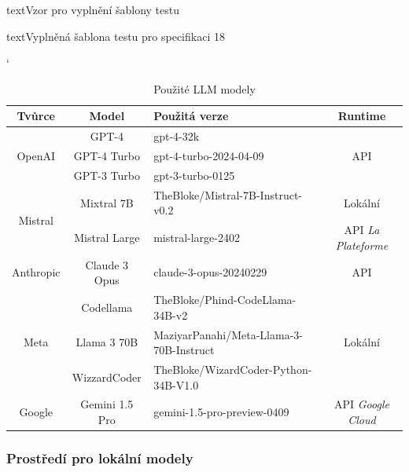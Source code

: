 \documentclass[czech, ma, kiv, he, iso690numb, pdf, viewonly]{fasthesis}
\begin{document}
\begin{code}{text}{Vzor pro vyplnění šablony testu \label{lst:template}}
{\begin{code}{text}{Vyplněná šablona testu pro specifikaci 18 \label{lst:spec18}}
{            \begin{table}[H]
                \catcode`
                \begin{tabular}{|c|c|p{5cm}|c|}
                    \hline
                    \textbf{Tvůrce} & \textbf{Model} & \textbf{Použitá verze} & \textbf{Runtime} \\
                    \hline
                    \multirow{3}{*}{OpenAI} & GPT-4 & gpt-4-32k & \multirow{3}{*}{API} \\
                    \cline{2-3} 
                    & GPT-4 Turbo & gpt-4-turbo-2024-04-09 &  \\
                    \cline{2-3} 
                    & GPT-3 Turbo & gpt-3-turbo-0125 &  \\
                    \hline
                    \multirow{2}{*}{Mistral} & Mixtral 7B & TheBloke/Mistral-7B-Instruct-v0.2 & Lokální \\
                    \cline{2-4} 
                     & Mistral Large & mistral-large-2402 & API \textit{La Plateforme} \\
                    \hline
                    Anthropic & Claude 3 Opus & claude-3-opus-20240229 & API \\
                    \hline
                    \multirow{3}{*}{Meta} & Codellama & TheBloke/Phind-CodeLlama-34B-v2 & \multirow{3}{*}{Lokální} \\
                    \cline{2-3}
                     & Llama 3 70B & MaziyarPanahi/Meta-Llama-3-70B-Instruct & \\
                    \cline{2-3}
                     & WizzardCoder & TheBloke/WizardCoder-Python-34B-V1.0 & \\
                    \hline
                    Google & Gemini 1.5 Pro & gemini-1.5-pro-preview-0409 & API \textit{Google Cloud} \\
                    \hline
                \end{tabular}
                \centering
                \caption{Použité LLM modely}
                \label{tab:used_models}
            \end{table}

            \subsubsection{Prostředí pro lokální modely} \label{sec:local_env}

}
\end{code}}
\end{code}
\end{document}
